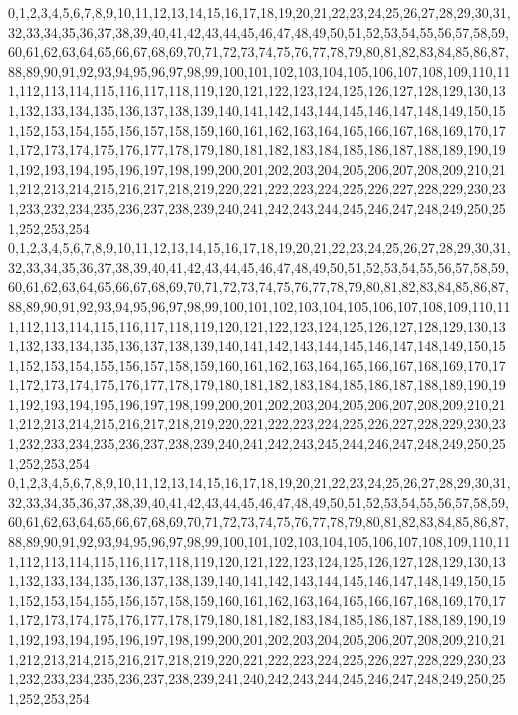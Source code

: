 \documentclass[12pt]{article}
\begin{document}
{0,1,2,3,4,5,6,7,8,9,10,11,12,13,14,15,16,17,18,19,20,21,22,23,24,25,26,27,28,29,30,31,32,33,34,35,36,37,38,39,40,41,42,43,44,45,46,47,48,49,50,51,52,53,54,55,56,57,58,59,60,61,62,63,64,65,66,67,68,69,70,71,72,73,74,75,76,77,78,79,80,81,82,83,84,85,86,87,88,89,90,91,92,93,94,95,96,97,98,99,100,101,102,103,104,105,106,107,108,109,110,111,112,113,114,115,116,117,118,119,120,121,122,123,124,125,126,127,128,129,130,131,132,133,134,135,136,137,138,139,140,141,142,143,144,145,146,147,148,149,150,151,152,153,154,155,156,157,158,159,160,161,162,163,164,165,166,167,168,169,170,171,172,173,174,175,176,177,178,179,180,181,182,183,184,185,186,187,188,189,190,191,192,193,194,195,196,197,198,199,200,201,202,203,204,205,206,207,208,209,210,211,212,213,214,215,216,217,218,219,220,221,222,223,224,225,226,227,228,229,230,231,233,232,234,235,236,237,238,239,240,241,242,243,244,245,246,247,248,249,250,251,252,253,254\\
0,1,2,3,4,5,6,7,8,9,10,11,12,13,14,15,16,17,18,19,20,21,22,23,24,25,26,27,28,29,30,31,32,33,34,35,36,37,38,39,40,41,42,43,44,45,46,47,48,49,50,51,52,53,54,55,56,57,58,59,60,61,62,63,64,65,66,67,68,69,70,71,72,73,74,75,76,77,78,79,80,81,82,83,84,85,86,87,88,89,90,91,92,93,94,95,96,97,98,99,100,101,102,103,104,105,106,107,108,109,110,111,112,113,114,115,116,117,118,119,120,121,122,123,124,125,126,127,128,129,130,131,132,133,134,135,136,137,138,139,140,141,142,143,144,145,146,147,148,149,150,151,152,153,154,155,156,157,158,159,160,161,162,163,164,165,166,167,168,169,170,171,172,173,174,175,176,177,178,179,180,181,182,183,184,185,186,187,188,189,190,191,192,193,194,195,196,197,198,199,200,201,202,203,204,205,206,207,208,209,210,211,212,213,214,215,216,217,218,219,220,221,222,223,224,225,226,227,228,229,230,231,232,233,234,235,236,237,238,239,240,241,242,243,245,244,246,247,248,249,250,251,252,253,254\\
0,1,2,3,4,5,6,7,8,9,10,11,12,13,14,15,16,17,18,19,20,21,22,23,24,25,26,27,28,29,30,31,32,33,34,35,36,37,38,39,40,41,42,43,44,45,46,47,48,49,50,51,52,53,54,55,56,57,58,59,60,61,62,63,64,65,66,67,68,69,70,71,72,73,74,75,76,77,78,79,80,81,82,83,84,85,86,87,88,89,90,91,92,93,94,95,96,97,98,99,100,101,102,103,104,105,106,107,108,109,110,111,112,113,114,115,116,117,118,119,120,121,122,123,124,125,126,127,128,129,130,131,132,133,134,135,136,137,138,139,140,141,142,143,144,145,146,147,148,149,150,151,152,153,154,155,156,157,158,159,160,161,162,163,164,165,166,167,168,169,170,171,172,173,174,175,176,177,178,179,180,181,182,183,184,185,186,187,188,189,190,191,192,193,194,195,196,197,198,199,200,201,202,203,204,205,206,207,208,209,210,211,212,213,214,215,216,217,218,219,220,221,222,223,224,225,226,227,228,229,230,231,232,233,234,235,236,237,238,239,241,240,242,243,244,245,246,247,248,249,250,251,252,253,254\\
}
\end{document}
